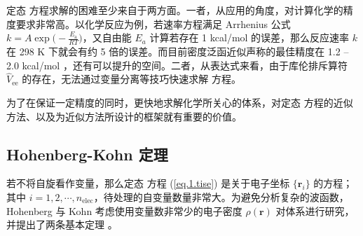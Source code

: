 定态 \Schrodinger 方程求解的困难至少来自于两方面。一者，从应用的角度，对计算化学的精度要求非常高。以化学反应为例，若速率方程满足 Arrhenius 公式 $k = A \exp \big( - \frac{E_\mathrm{a}}{R T} \big)$，又自由能 $E_a$ 计算若存在 1 kcal/mol 的误差，那么反应速率 $k$ 在 298 K 下就会有约 5 倍的误差。而目前密度泛函近似声称的最佳精度在 1.2 -- 2.0 kcal/mol \cite{Zhang-Xu.JPCL.2021, Santra-Martin.JPCL.2021}，还有可以提升的空间。二者，从表达式来看，由于库伦排斥算符 $\hat V_\mathrm{ee}$ 的存在，无法通过变量分离等技巧快速求解 \Schrodinger 方程。

为了在保证一定精度的同时，更快地求解化学所关心的体系，对定态 \Schrodinger 方程的近似方法、以及为近似方法所设计的框架就有重要的价值。

\subsection{Hohenberg-Kohn 定理}

若不将自旋看作变量，那么定态 \Schrodinger 方程 (\ref{eq.1.tise}) 是关于电子坐标 $\{\bm{r}_i\}$ 的方程；其中 $i = 1, 2, \cdots, n_\mathrm{elec}$，待处理的自变量数量非常大。为避免分析复杂的波函数，Hohenberg 与 Kohn 考虑使用变量数非常少的电子密度 $\rho(\bm{r})$ 对体系进行研究，并提出了两条基本定理 \cite{Hohenberg-Kohn.PR.1964}。

